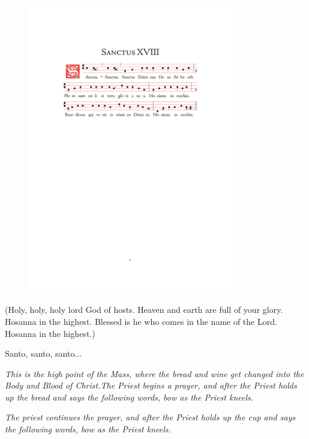 \documentclass[10pt,a5]{article}
\begin{document}
\begin{figure}[h]
	\centering
	\includegraphics[trim = 35mm 175mm 35.5mm 45mm, clip, width = 0.8\textwidth]{scores/Sanctus-XVIII.pdf}
\end{figure}

\begin{paracol}{2}

(Holy, holy, holy lord God of hosts.
Heaven and earth are full of your glory.
Hosanna in the highest.
Blessed is he who comes in the name of the Lord.
Hosanna in the highest.)

\switchcolumn
Santo, santo, santo...

\switchcolumn*

\medskip 
\small{\textit{This is the high point of the Mass, where the bread and wine get changed into the Body and Blood of Christ.The Priest begins a prayer, and after the Priest holds up the bread and says the following words, bow as the Priest kneels.}}


\small{\textit{The priest continues the prayer, and after the Priest holds up the cup and says the following words, bow as the Priest kneels.}}



\end{paracol}
\end{document}
